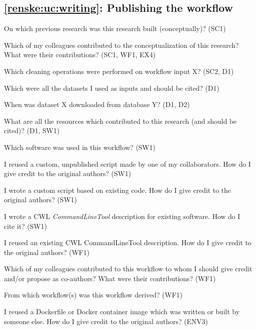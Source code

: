 \subsection{\ref{renske:uc:writing}: Publishing the workflow}
\begin{provquestions}[resume]
    \item On which previous research was this research built (conceptually)? (SC1)
    \item Which of my colleagues contributed to the conceptualization of this research? What were their contributions? (SC1, WF1, EX4)
    \item Which cleaning operations were performed on workflow input X? (SC2, D1)
    \item Which were all the datasets I used as inputs and should be cited? (D1)
    \item When was dataset X downloaded from database Y? (D1, D2)
    \item What are all the resources which contributed to this research (and should be cited)? (D1, SW1)
    \item Which software was used in this workflow? (SW1)
    \item I reused a custom, unpublished script made by one of my collaborators. How do I give credit to the original authors? (SW1)
    \item I wrote a custom script based on existing code. How do I give credit to the original authors? (SW1)
    \item I wrote a CWL \emph{CommandLineTool} description for existing software. How do I cite it? (SW1)
    \item I reused an existing CWL CommandLineTool description. How do I give credit to the original authors? (WF1)
    \item Which of my colleagues contributed to this workflow to whom I should give credit and/or propose as co-authors? What were their contributions? (WF1)
    \item From which workflow(s) was this workflow derived? (WF1)
    \item I reused a Dockerfile or Docker container image which was written or built by someone else. How do I give credit to the original authors? (ENV3)
\end{provquestions}

